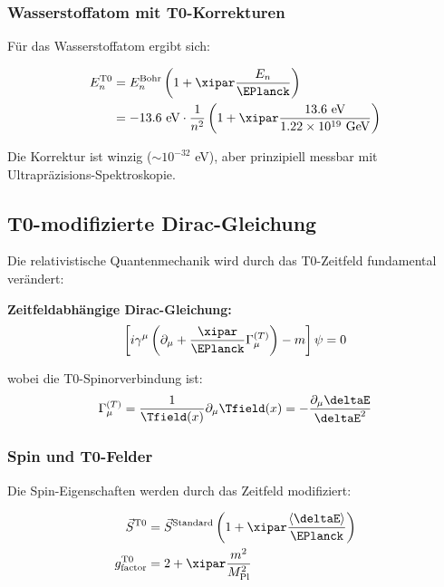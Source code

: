 	\subsubsection{Wasserstoffatom mit T0-Korrekturen}
	
	Für das Wasserstoffatom ergibt sich:
	
	\begin{align}
		E_n^{\text{T0}} &= E_n^{\text{Bohr}} \left(1 + \xipar \frac{E_n}{\EPlanck}\right) \\
		&= -13.6 \text{ eV} \cdot \frac{1}{n^2} \left(1 + \xipar \frac{13.6 \text{ eV}}{1.22 \times 10^{19} \text{ GeV}}\right)
	\end{align}
	
	Die Korrektur ist winzig ($\sim 10^{-32}$ eV), aber prinzipiell messbar mit Ultrapräzisions-Spektroskopie.
	
	\subsection{T0-modifizierte Dirac-Gleichung}
	
	Die relativistische Quantenmechanik wird durch das T0-Zeitfeld fundamental verändert:
	
	\begin{tcolorbox}[colback=magenta!5!white,colframe=magenta!75!black,title=T0-Dirac-Gleichung]
		\textbf{Zeitfeldabhängige Dirac-Gleichung:}
		\begin{equation}
			\left[i\gamma^\mu \left(\partial_\mu + \frac{\xipar}{\EPlanck} \Gamma_\mu^{(T)}\right) - m\right]\psi = 0
		\end{equation}
		
		wobei die T0-Spinorverbindung ist:
		\begin{equation}
			\Gamma_\mu^{(T)} = \frac{1}{\Tfield(x)} \partial_\mu \Tfield(x) = -\frac{\partial_\mu \deltaE}{\deltaE^2}
		\end{equation}
	\end{tcolorbox}
	
	\subsubsection{Spin und T0-Felder}
	
	Die Spin-Eigenschaften werden durch das Zeitfeld modifiziert:
	
	\begin{align}
		\vec{S}^{\text{T0}} &= \vec{S}^{\text{Standard}} \left(1 + \xipar \frac{\langle\deltaE\rangle}{\EPlanck}\right) \\
		g_{\text{factor}}^{\text{T0}} &= 2 + \xipar \frac{m^2}{M_{\text{Pl}}^2}
	\end{align}
	
